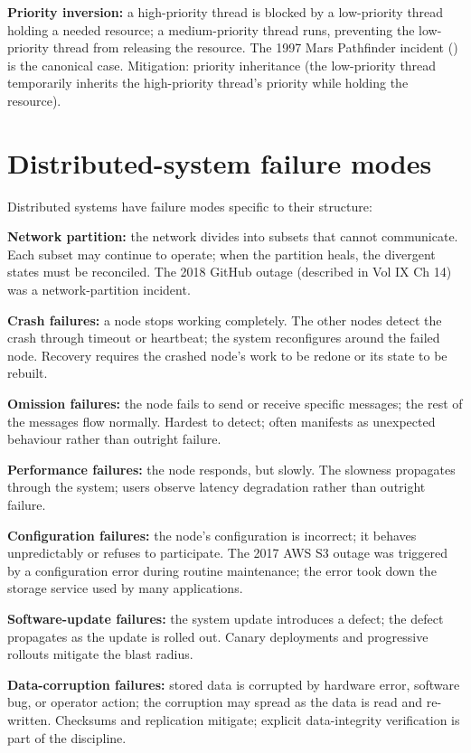 \textbf{Priority inversion:} a high-priority thread is blocked by a low-priority thread holding a needed resource; a medium-priority thread runs, preventing the low-priority thread from releasing the resource. The 1997 Mars Pathfinder incident (\cite{paper:jones-pathfinder-1997}) is the canonical case. Mitigation: priority inheritance (the low-priority thread temporarily inherits the high-priority thread's priority while holding the resource).

\section{Distributed-system failure modes}

Distributed systems have failure modes specific to their structure:

\textbf{Network partition:} the network divides into subsets that cannot communicate. Each subset may continue to operate; when the partition heals, the divergent states must be reconciled. The 2018 GitHub outage (described in Vol IX Ch 14) was a network-partition incident.

\textbf{Crash failures:} a node stops working completely. The other nodes detect the crash through timeout or heartbeat; the system reconfigures around the failed node. Recovery requires the crashed node's work to be redone or its state to be rebuilt.

\textbf{Omission failures:} the node fails to send or receive specific messages; the rest of the messages flow normally. Hardest to detect; often manifests as unexpected behaviour rather than outright failure.

\textbf{Performance failures:} the node responds, but slowly. The slowness propagates through the system; users observe latency degradation rather than outright failure.

\textbf{Configuration failures:} the node's configuration is incorrect; it behaves unpredictably or refuses to participate. The 2017 AWS S3 outage was triggered by a configuration error during routine maintenance; the error took down the storage service used by many applications.

\textbf{Software-update failures:} the system update introduces a defect; the defect propagates as the update is rolled out. Canary deployments and progressive rollouts mitigate the blast radius.

\textbf{Data-corruption failures:} stored data is corrupted by hardware error, software bug, or operator action; the corruption may spread as the data is read and re-written. Checksums and replication mitigate; explicit data-integrity verification is part of the discipline.

